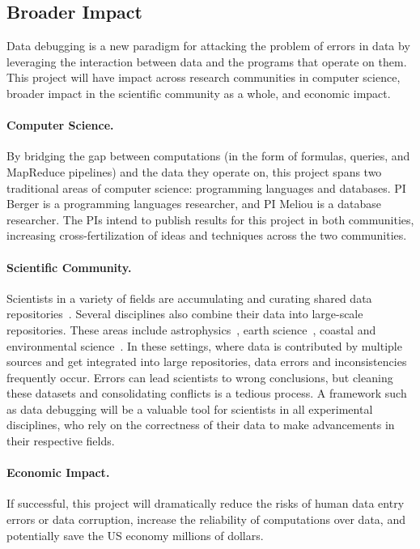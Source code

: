 \subsection{Broader Impact} 

Data debugging is a new paradigm for attacking the problem of errors
in data by leveraging the interaction between data and the programs
that operate on them. This project will have impact across research
communities in computer science, broader impact in the scientific
community as a whole, and economic impact.

\paragraph{Computer Science.}
By bridging the gap between computations (in the form of formulas,
queries, and MapReduce pipelines) and the data they operate on, this
project spans two traditional areas of computer science: programming
languages and databases. PI Berger is a programming languages
researcher, and PI Meliou is a database researcher. The PIs intend to
publish results for this project in both communities, increasing
cross-fertilization of ideas and techniques across the two
communities.

\paragraph{Scientific Community.} %
\label{par:scientific}
Scientists in a variety of fields are accumulating and curating shared
data repositories~\cite{uniprot,naturemap}. Several disciplines also
combine their data into large-scale repositories. These areas include
astrophysics~\cite{skysurvey}, earth science~\cite{iris,unavco},
coastal and environmental science~\cite{wagda}. In these settings,
where data is contributed by multiple sources and get integrated into
large repositories, data errors and inconsistencies frequently
occur. Errors can lead scientists to wrong conclusions, but cleaning
these datasets and consolidating conflicts is a tedious process. A
framework such as data debugging will be a valuable tool for
scientists in all experimental disciplines, who rely on the
correctness of their data to make advancements in their respective
fields.

\paragraph{Economic Impact.}
If successful, this project will dramatically reduce the risks of
human data entry errors or data corruption, increase the reliability
of computations over data, and potentially save the US economy
millions of dollars.

